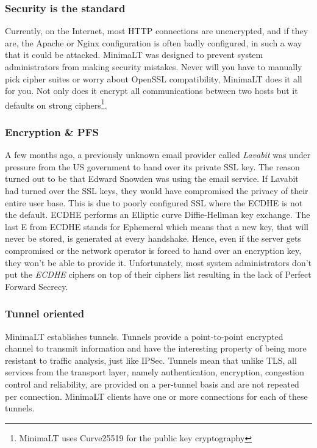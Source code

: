 \documentclass{vldb}
\begin{document}
\subsubsection{Security is the standard}

Currently, on the Internet, most HTTP connections are unencrypted, and if they are, the Apache or Nginx configuration is often badly configured, in such a way that it could be attacked. MinimaLT was designed to prevent system administrators from making security mistakes. Never will you have to manually pick cipher suites or worry about OpenSSL compatibility, MinimaLT does it all for you. Not only does it encrypt all communications between two hosts but it defaults on strong ciphers\footnote{MinimaLT uses Curve25519 for the public key cryptography}.

\subsubsection{Encryption \& PFS}

A few months ago, a previously unknown email provider called \emph{Lavabit} was under pressure from the US government to hand over its private SSL key. The reason turned out to be that Edward Snowden was using the email service. If Lavabit had turned over the SSL keys, they would have compromised the privacy of their entire user base. This is due to poorly configured SSL where the ECDHE is not the default. ECDHE performs an Elliptic curve Diffie-Hellman key exchange. The last E from ECDHE stands for Ephemeral which means that a new key, that will never be stored, is generated at every handshake. Hence, even if the server gets compromised or the network operator is forced to hand over an encryption key, they won't be able to provide it. Unfortunately, most system administrators don't put the \emph{ECDHE} ciphers on top of their ciphers list resulting in the lack of Perfect Forward Secrecy.

\subsubsection{Tunnel oriented}

MinimaLT establishes tunnels. Tunnels provide a point-to-point encrypted channel to transmit information and have the interesting property of being more resistant to traffic analysis, just like IPSec. Tunnels mean that unlike TLS, all services from the transport layer, namely authentication, encryption, congestion control and reliability, are provided on a per-tunnel basis and are not repeated per connection. MinimaLT clients have one or more connections for each of these tunnels.
\end{document}
